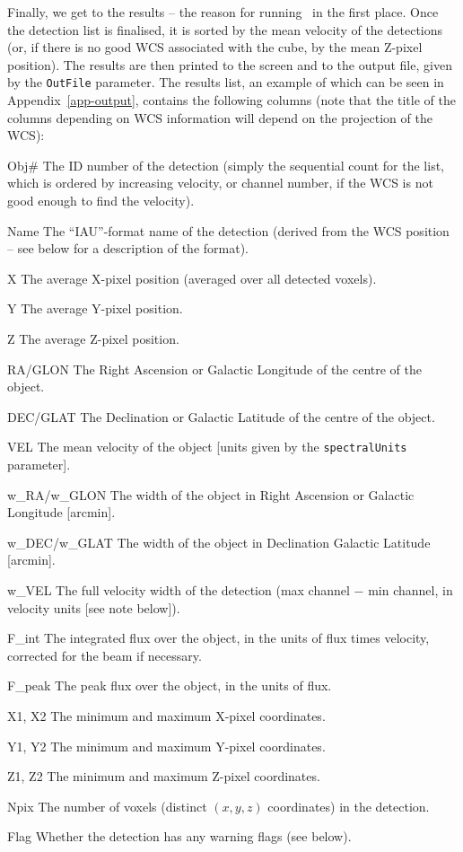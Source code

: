 

Finally, we get to the results -- the reason for running \duchamp\ in
the first place. Once the detection list is finalised, it is sorted by
the mean velocity of the detections (or, if there is no good WCS
associated with the cube, by the mean Z-pixel position). The results
are then printed to the screen and to the output file, given by the
\texttt{OutFile} parameter. The results list, an example of which can
be seen in Appendix~\ref{app-output}, contains the following columns
(note that the title of the columns depending on WCS information will
depend on the projection of the WCS):

\begin{entry}
\item[Obj\#] The ID number of the detection (simply the sequential
  count for the list, which is ordered by increasing velocity, or
  channel number, if the WCS is not good enough to find the velocity).
\item[Name] The ``IAU''-format name of the detection (derived from the
  WCS position -- see below for a description of the format).
\item[X] The average X-pixel position (averaged over all detected
voxels).
\item[Y] The average Y-pixel position.
\item[Z] The average Z-pixel position.
\item[RA/GLON] The Right Ascension or Galactic Longitude of the centre
of the object.
\item[DEC/GLAT] The Declination or Galactic Latitude of the centre of
the object.
\item[VEL] The mean velocity of the object [units given by the
  \texttt{spectralUnits} parameter].
\item[w\_RA/w\_GLON] The width of the object in Right Ascension or
Galactic Longitude [arcmin].
\item[w\_DEC/w\_GLAT] The width of the object in Declination Galactic
  Latitude [arcmin].
\item[w\_VEL] The full velocity width of the detection (max channel
  $-$ min channel, in velocity units [see note below]).
\item[F\_int] The integrated flux over the object, in the units of
  flux times velocity, corrected for the beam if necessary.
\item[F\_peak] The peak flux over the object, in the units of flux.
\item[X1, X2] The minimum and maximum X-pixel coordinates.
\item[Y1, Y2] The minimum and maximum Y-pixel coordinates.
\item[Z1, Z2] The minimum and maximum Z-pixel coordinates.
\item[Npix] The number of voxels (\ie distinct $(x,y,z)$ coordinates)
  in the detection.
\item[Flag] Whether the detection has any warning flags (see below).
\end{entry}
